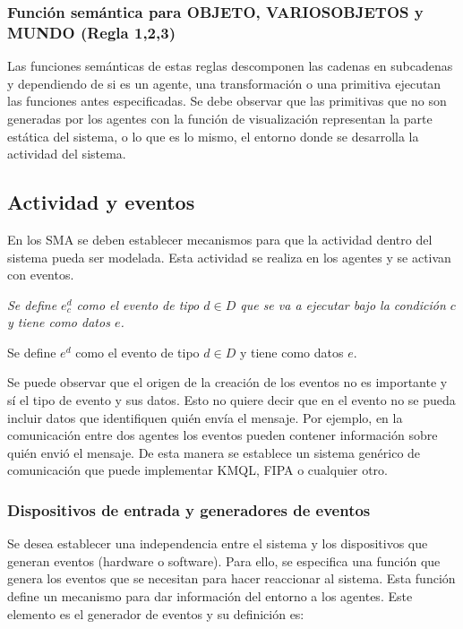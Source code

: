 \documentclass[runningheads]{llncs}
\begin{document}
\subsubsection{Funci\'on sem\'antica para OBJETO, VARIOSOBJETOS y MUNDO (Regla 1,2,3)\label{sec:FuncionAgente}}

Las funciones sem\'anticas de estas reglas descomponen las cadenas en subcadenas y dependiendo de si es un agente, una transformaci\'on o una primitiva ejecutan las funciones antes especificadas. Se debe observar que las primitivas que no son generadas por los agentes con la funci\'on de visualizaci\'on representan la parte est\'atica del sistema, o lo que es lo mismo, el entorno donde se desarrolla la actividad del sistema.


\subsection{Actividad y eventos\label{sec:ActividadYEventos}}

En los SMA se deben establecer mecanismos para que la actividad dentro del sistema pueda ser modelada. Esta actividad se realiza en los agentes y se activan con eventos. 

{\itshape
Se define $e^{d}_{c}$ como el evento de tipo $d \in D$ que se va a ejecutar bajo la condici\'on $c$ y tiene como datos $e$.

Se define $e^{d}$ como el evento de tipo $d \in D$ y tiene como datos $e$.
}

Se puede observar que el origen de la creaci\'on de los eventos no es importante y s\'i el tipo de evento y sus datos. Esto no quiere decir que en el evento no se pueda incluir datos que identifiquen qui\'en env\'ia el mensaje. Por ejemplo, en la comunicaci\'on entre dos agentes  los eventos pueden contener informaci\'on sobre qui\'en envi\'o el mensaje. De esta manera se establece un sistema gen\'erico de comunicaci\'on que puede implementar KMQL, FIPA \cite{Genesereth1995} o cualquier otro.
	
\subsubsection{Dispositivos de entrada y generadores de eventos\label{sec:DipositivosDeEntradaYGeneradoresDeEventos}}

	Se desea establecer una independencia entre el sistema y los dispositivos que generan eventos (hardware o software). Para ello, se especifica una funci\'on que genera los eventos que se necesitan para hacer reaccionar al sistema. Esta funci\'on define un mecanismo para dar informaci\'on del entorno a los agentes. Este elemento es el generador de eventos y su definici\'on es:
	
\end{document}
